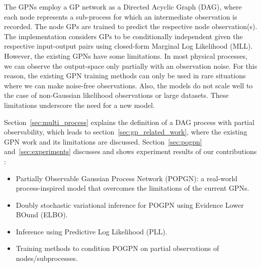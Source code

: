The GPNs employ a GP network as a Directed Acyclic Graph (DAG), where each node represents a sub-process for which an intermediate observation is recorded. The node GPs are trained to predict the respective node observation(s). The implementation considers GPs to be conditionally independent given the respective input-output pairs using closed-form Marginal Log Likelihood (MLL). However, the existing GPNs have some limitations. In most physical processes, we can observe the output-space only partially with an observation noise. For this reason, the existing GPN training methods can only be used in rare situations where we can make noise-free observations. Also, the models do not scale well to the case of non-Gaussian likelihood observations or large datasets. These limitations underscore the need for a new model.

Section~\ref{sec:multi_process} explains the definition of a DAG process with partial observability, which leads to section~\ref{sec:gp_related_work}, where the existing GPN work and its limitations are discussed. Section~\ref{sec:pogpn} and~\ref{sec:experiments} discusses and shows experiment results of our contributions :
\begin{itemize}
    \item Partially Observable Gaussian Process Network (POPGN): a real-world process-inspired model that overcomes the limitations of the current GPNs.
    \item Doubly stochastic variational inference for POGPN using Evidence Lower BOund (ELBO).
    \item Inference using Predictive Log Likelihood (PLL).
    \item Training methods to condition POGPN on partial observations of nodes/subprocesses.
\end{itemize}